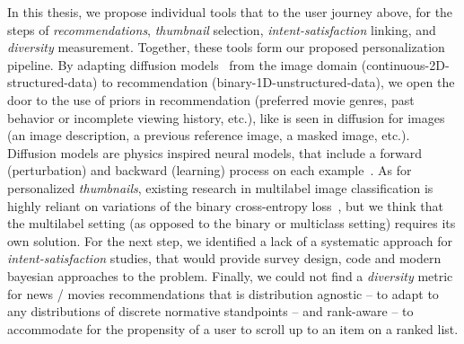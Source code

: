 In this thesis, we propose individual tools that  to the user journey above, for the steps of \emph{recommendations}, \emph{thumbnail} selection, \emph{intent-satisfaction} linking, and \emph{diversity} measurement. 
Together, these tools form our proposed personalization pipeline. 
By adapting diffusion models~\cite{jascha} from the image domain (continuous-2D-structured-data) to recommendation (binary-1D-unstructured-data), we open the door to the use of priors in recommendation (preferred movie genres, past behavior or incomplete viewing history, etc.), like is seen in diffusion for images (an image description, a previous reference image, a masked image, etc.). Diffusion models are physics inspired neural models, that include a forward (perturbation) and backward (learning) process on each example~\cite{jascha}. As for personalized \emph{thumbnails}, existing research in multilabel image classification is highly reliant on variations of the binary cross-entropy loss~\cite{fisher}, but we think that the multilabel setting (as opposed to the binary or multiclass setting) requires its own solution. For the next step, we identified a lack of a systematic approach for \emph{intent-satisfaction} studies, that would provide survey design, code and modern bayesian approaches to the problem. 
 Finally, we could not find a \emph{diversity} metric for news / movies recommendations that is distribution agnostic -- to adapt to any distributions of discrete normative standpoints -- and rank-aware -- to accommodate for the propensity of a user to scroll up to an item on a ranked list.


